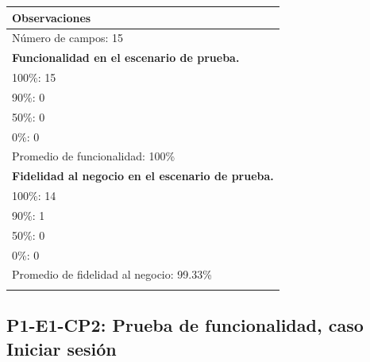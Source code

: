 \documentclass[oneside,10pt]{book}
\begin{document}
\begin{tabularx}{\textwidth}{ X }
\multicolumn{1}{X}{\cellcolor[HTML]{9B9B9B}\textbf{Observaciones}} \\ \hline
\multicolumn{1}{|l|}{Número de campos: 15 }	\\
\multicolumn{1}{|l|}{\textbf{Funcionalidad en el escenario de prueba.} }	\\
\multicolumn{1}{|l|}{100\%: 15 }	\\
\multicolumn{1}{|l|}{90\%: 0 }	\\
\multicolumn{1}{|l|}{50\%: 0 }	\\
\multicolumn{1}{|l|}{0\%: 0 }	\\
\multicolumn{1}{|l|}{Promedio de funcionalidad: 100\% }	\\
\multicolumn{1}{|l|}{\textbf{Fidelidad al negocio en el escenario de prueba.} }	\\
\multicolumn{1}{|l|}{100\%: 14 }	\\
\multicolumn{1}{|l|}{90\%: 1 }	\\
\multicolumn{1}{|l|}{50\%: 0 }	\\
\multicolumn{1}{|l|}{0\%: 0 }	\\
\multicolumn{1}{|l|}{Promedio de fidelidad al negocio: 99.33\% }	\\
\multicolumn{1}{|l|}{ }	\\ \hline
\end{tabularx}
\newpage
\subsection{P1-E1-CP2: Prueba de funcionalidad, caso Iniciar sesión}
\end{document}
